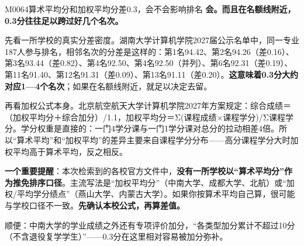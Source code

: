 \begin{qa}{M0064}{算术平均分和加权平均分差0.3，会不会影响排名}
\textbf{会。而且在名额线附近，0.3分往往足以跨过好几个名次。}

先看一所学校的真实分差密度。湖南大学计算机学院2027届公示名单中，同一专业187人参与排名，相邻名次的分差是这样的：第1名94.42、第2名94.26（差0.16）、第3名93.44（差0.82）、第4名92.50、第4名92.50（并列）、第6名92.31（差0.19）、第11名91.40、第12名91.31（差0.09）、第13名91.11（差0.20）。\textbf{这意味着0.3分大约对应1—4个名次}；如果在名额线附近，就足以决定去留。

再看加权公式本身。北京航空航天大学计算机学院2027年方案规定：综合成绩＝（加权平均分＋综合加分）/1.1，加权平均分＝Σ(课程成绩×课程学分)/Σ课程学分。学分权重是直接的：一门4学分课与一门1学分课对总分的拉动相差4倍。所以“算术平均”和“加权平均”的差异主要来自课程学分分布——高分课程学分大时加权平均高于算术平均，反之相反。

\textbf{一个重要提醒}：本次检索到的各校官方文件中，\textbf{没有一所学校以“算术平均分”作为推免排序口径}。主流写法是“加权平均分”（中南大学、成都大学、北航）或“加权/平均学分绩点”（燕山大学、内蒙古大学）。如果你按算术平均自己算，很可能与学校口径不一致。\textbf{先确认本校公式，再算差值。}

顺便：中南大学的学业成绩之外还有专项评价加分，“各类型加分累计不超过10分（不含退役复学学生）”——0.3分在这里相对容易被加分弥补。
\end{qa}

